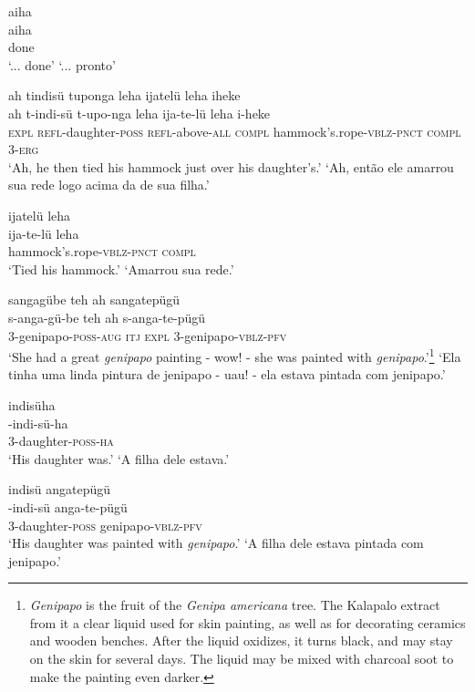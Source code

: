 \documentclass[output=paper,
modfonts,nonflat
]{langsci/langscibook}
\begin{document}
\ea  aiha\\[.3em]
\gll aiha\\
     done\\
\glt ‘... done’
\glt ‘... pronto’
\z

\ea  ah tindisü tuponga leha ijatelü leha iheke\\[.3em]
\gll ah t-indi-sü t-upo-nga leha ija-te-lü leha i-heke\\
     \textsc{expl} \textsc{refl}-daughter-\textsc{poss} \textsc{refl}-above-\textsc{all} \textsc{compl} hammock's.rope-\textsc{vblz}-\textsc{pnct} \textsc{compl} 3-\textsc{erg}\\
\glt ‘Ah, he then tied his hammock just over his daughter's.’
\glt ‘Ah, então ele amarrou sua rede logo acima da de sua filha.’
\z

\ea  ijatelü leha\\[.3em]
\gll ija-te-lü leha\\
     hammock's.rope-\textsc{vblz}-\textsc{pnct} \textsc{compl}\\
\glt ‘Tied his hammock.’
\glt ‘Amarrou sua rede.’
\z

\ea  sangagübe teh ah sangatepügü\\[.3em]
\gll s-anga-gü-be teh ah s-anga-te-pügü\\
     3-genipapo-\textsc{poss}-\textsc{aug} \textsc{itj} \textsc{expl} 3-genipapo-\textsc{vblz}-\textsc{pfv}\\
\glt ‘She had a great \textit{genipapo} painting - wow! - she was painted with \textit{genipapo}.’\footnote{\textit{Genipapo} is the fruit of the \textit{Genipa americana} tree. The Kalapalo extract from it a clear liquid used for skin painting, as well as for decorating ceramics and wooden benches. After the liquid oxidizes, it turns black, and may stay on the skin for several days. The liquid may be mixed with charcoal soot to make the painting even darker.}
\glt ‘Ela tinha uma linda pintura de jenipapo - uau! - ela estava pintada com jenipapo.’
\z

\ea  indisüha\\[.3em]
-indi-sü-ha\\
     3-daughter-\textsc{poss}-\textsc{ha}\\
\glt ‘His daughter was.’
\glt ‘A filha dele estava.’
\z

\ea  indisü angatepügü\\[.3em]
-indi-sü anga-te-pügü\\
     3-daughter-\textsc{poss} genipapo-\textsc{vblz}-\textsc{pfv}\\
\glt ‘His daughter was painted with \textit{genipapo}.’
\glt ‘A filha dele estava pintada com jenipapo.’
\z
\end{document}
